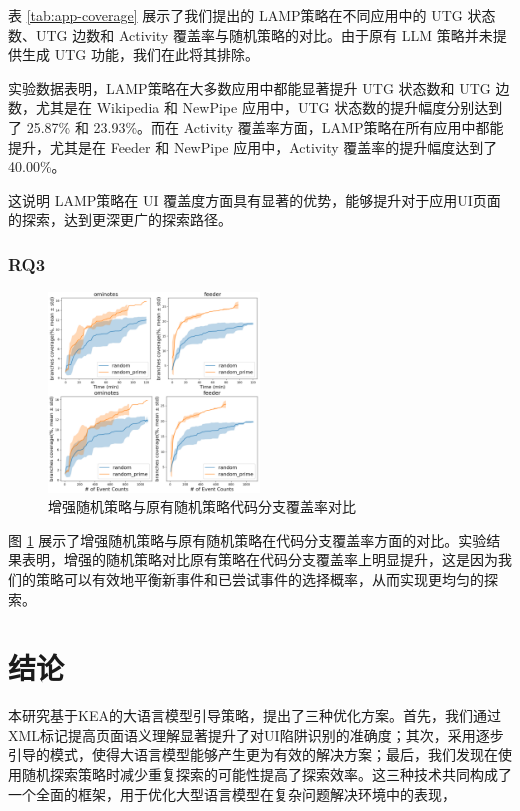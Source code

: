 \documentclass[twocolumn, 10pt]{article}
\newcommand{\kea}{K{\small\MakeUppercase{ea}}}
\newcommand{\lamp}{L{\small\MakeUppercase{amp}}}
\begin{document}
表 \ref{tab:app-coverage} 展示了我们提出的 \lamp 策略在不同应用中的 UTG 状态数、UTG 边数和 Activity 覆盖率与随机策略的对比。由于原有 LLM 策略并未提供生成 UTG 功能，我们在此将其排除。

实验数据表明，\lamp 策略在大多数应用中都能显著提升 UTG 状态数和 UTG 边数，尤其是在 Wikipedia 和 NewPipe 应用中，UTG 状态数的提升幅度分别达到了 25.87\% 和 23.93\%。而在 Activity 覆盖率方面，\lamp 策略在所有应用中都能提升，尤其是在 Feeder 和 NewPipe 应用中，Activity 覆盖率的提升幅度达到了 40.00\%。

这说明 \lamp 策略在 UI 覆盖度方面具有显著的优势，能够提升对于应用UI页面的探索，达到更深更广的探索路径。

\subsubsection{RQ3}

\begin{figure}[t]
\centering
\includegraphics[width=0.5\textwidth]{rq3.png}
\caption{增强随机策略与原有随机策略代码分支覆盖率对比}
\label{fig:rq3}
\end{figure}

图 \ref{fig:rq3} 展示了增强随机策略与原有随机策略在代码分支覆盖率方面的对比。实验结果表明，增强的随机策略对比原有策略在代码分支覆盖率上明显提升，这是因为我们的策略可以有效地平衡新事件和已尝试事件的选择概率，从而实现更均匀的探索。

\section{结论}

本研究基于\kea 的大语言模型引导策略，提出了三种优化方案。首先，我们通过XML标记提高页面语义理解显著提升了对UI陷阱识别的准确度；其次，采用逐步引导的模式，使得大语言模型能够产生更为有效的解决方案；最后，我们发现在使用随机探索策略时减少重复探索的可能性提高了探索效率。这三种技术共同构成了一个全面的框架，用于优化大型语言模型在复杂问题解决环境中的表现，
\end{document}
